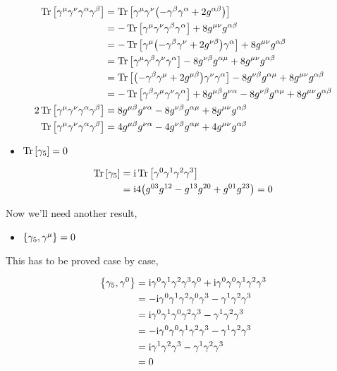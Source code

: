\begin{align}
    \Tr\qty[\gamma^\mu \gamma^\nu\gamma^{\alpha}\gamma^{\beta}]&=\Tr\qty[\gamma^\mu \gamma^\nu\qty(-\gamma^{\beta}\gamma^{\alpha}+2g^{\alpha\beta})]\nonumber\\
    &=-\Tr\qty[\gamma^\mu \gamma^\nu\gamma^{\beta}\gamma^{\alpha}]+8g^{\mu\nu}g^{\alpha\beta}\nonumber\\
    &=-\Tr\qty[\gamma^\mu\qty(- \gamma^\beta\gamma^{\nu}+2g^{\nu\beta})\gamma^{\alpha}]+8g^{\mu\nu}g^{\alpha\beta}\nonumber\\
    &=\Tr\qty[\gamma^\mu\gamma^\beta\gamma^{\nu}\gamma^{\alpha}]-8g^{\nu\beta}g^{\alpha\mu}+8g^{\mu\nu}g^{\alpha\beta}\nonumber\\
    &=\Tr\qty[\qty(-\gamma^\beta\gamma^\mu+2g^{\mu\beta})\gamma^{\nu}\gamma^{\alpha}]-8g^{\nu\beta}g^{\alpha\mu}+8g^{\mu\nu}g^{\alpha\beta}\nonumber\\
    &=-\Tr\qty[\gamma^\beta\gamma^\mu\gamma^{\nu}\gamma^{\alpha}]+8g^{\mu\beta}g^{\nu\alpha}-8g^{\nu\beta}g^{\alpha\mu}+8g^{\mu\nu}g^{\alpha\beta}\nonumber\\
    2\Tr\qty[\gamma^\mu\gamma^{\nu}\gamma^{\alpha}\gamma^\beta]&=8g^{\mu\beta}g^{\nu\alpha}-8g^{\nu\beta}g^{\alpha\mu}+8g^{\mu\nu}g^{\alpha\beta}\nonumber\\
    \Tr\qty[\gamma^\mu\gamma^{\nu}\gamma^{\alpha}\gamma^\beta]&=4g^{\mu\beta}g^{\nu\alpha}-4g^{\nu\beta}g^{\alpha\mu}+4g^{\mu\nu}g^{\alpha\beta}\nonumber
\end{align}

\begin{itemize}
    \item $\Tr\qty[\gamma_5]=0$
\end{itemize}

\begin{align}
    \Tr\qty[\gamma_5]&=\textnormal{i}\Tr\qty[\gamma^0\gamma^1\gamma^2\gamma^3]\nonumber\\
    &=\textnormal{i}4\qty(g^{03}g^{12}-g^{13}g^{20}+g^{01}g^{23})=0\nonumber
\end{align}

Now we'll need another result,

\begin{itemize}
    \item $\acomm{\gamma_5}{\gamma^\mu}=0$
\end{itemize}

This has to be proved case by case,

\begin{align}
    \acomm{\gamma_5}{\gamma^0}&=\im\gamma^0\gamma^1\gamma^2\gamma^3\gamma^0+\im\gamma^0\gamma^0\gamma^1\gamma^2\gamma^3\nonumber\\
    &=-\im\gamma^0\gamma^1\gamma^2\gamma^0\gamma^3-\gamma^1\gamma^2\gamma^3\nonumber\\
    &=\im\gamma^0\gamma^1\gamma^0\gamma^2\gamma^3-\gamma^1\gamma^2\gamma^3\nonumber\\
    &=-\im\gamma^0\gamma^0\gamma^1\gamma^2\gamma^3-\gamma^1\gamma^2\gamma^3\nonumber\\
    &=\im\gamma^1\gamma^2\gamma^3-\gamma^1\gamma^2\gamma^3\nonumber\\
    &=0\nonumber
\end{align}

